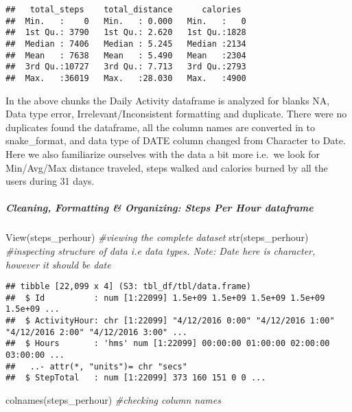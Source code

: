 \documentclass[
]{article}
\newenvironment{Shaded}{\begin{snugshade}}{\end{snugshade}}
\newcommand{\CommentTok}[1]{\textcolor[rgb]{0.56,0.35,0.01}{\textit{#1}}}
\newcommand{\FunctionTok}[1]{\textcolor[rgb]{0.00,0.00,0.00}{#1}}
\newcommand{\NormalTok}[1]{#1}
\begin{document}
\begin{verbatim}
##   total_steps    total_distance      calories   
##  Min.   :    0   Min.   : 0.000   Min.   :   0  
##  1st Qu.: 3790   1st Qu.: 2.620   1st Qu.:1828  
##  Median : 7406   Median : 5.245   Median :2134  
##  Mean   : 7638   Mean   : 5.490   Mean   :2304  
##  3rd Qu.:10727   3rd Qu.: 7.713   3rd Qu.:2793  
##  Max.   :36019   Max.   :28.030   Max.   :4900
\end{verbatim}

In the above chunks the Daily Activity dataframe is analyzed for blanks
NA, Data type error, Irrelevant/Inconsistent formatting and duplicate.
There were no duplicates found the dataframe, all the column names are
converted in to snake\_format, and data type of DATE column changed from
Character to Date. Here we also familiarize ourselves with the data a
bit more i.e.~we look for Min/Avg/Max distance traveled, steps walked
and calories burned by all the users during 31 days.

\hypertarget{cleaning-formatting-organizing-steps-per-hour-dataframe}{%
\subparagraph{\texorpdfstring{\textbf{Cleaning, Formatting \&
Organizing: Steps Per Hour
dataframe}}{Cleaning, Formatting \& Organizing: Steps Per Hour dataframe}}\label{cleaning-formatting-organizing-steps-per-hour-dataframe}}

\begin{Shaded}
\begin{Highlighting}[]
 \FunctionTok{View}\NormalTok{(steps\_perhour) }\CommentTok{\#viewing the complete dataset}
 \FunctionTok{str}\NormalTok{(steps\_perhour) }\CommentTok{\#inspecting structure of data i.e data types. Note: Date here is character, however it should be date}
\end{Highlighting}
\end{Shaded}

\begin{verbatim}
## tibble [22,099 x 4] (S3: tbl_df/tbl/data.frame)
##  $ Id          : num [1:22099] 1.5e+09 1.5e+09 1.5e+09 1.5e+09 1.5e+09 ...
##  $ ActivityHour: chr [1:22099] "4/12/2016 0:00" "4/12/2016 1:00" "4/12/2016 2:00" "4/12/2016 3:00" ...
##  $ Hours       : 'hms' num [1:22099] 00:00:00 01:00:00 02:00:00 03:00:00 ...
##   ..- attr(*, "units")= chr "secs"
##  $ StepTotal   : num [1:22099] 373 160 151 0 0 ...
\end{verbatim}

\begin{Shaded}
\begin{Highlighting}[]
 \FunctionTok{colnames}\NormalTok{(steps\_perhour)  }\CommentTok{\#checking column names}
\end{Highlighting}
\end{Shaded}
\end{document}
